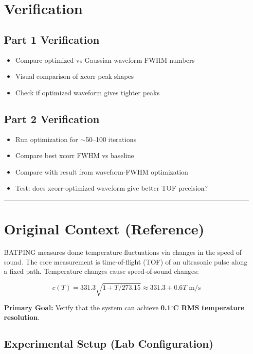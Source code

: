 \documentclass[11pt]{article}
\begin{document}
\section{Verification}

\subsection{Part 1 Verification}
\begin{itemize}
    \item Compare optimized vs Gaussian waveform FWHM numbers
    \item Visual comparison of xcorr peak shapes
    \item Check if optimized waveform gives tighter peaks
\end{itemize}

\subsection{Part 2 Verification}
\begin{itemize}
    \item Run optimization for $\sim$50--100 iterations
    \item Compare best xcorr FWHM vs baseline
    \item Compare with result from waveform-FWHM optimization
    \item Test: does xcorr-optimized waveform give better TOF precision?
\end{itemize}

\hrule
\vspace{1em}

\section{Original Context (Reference)}

BATPING measures dome temperature fluctuations via changes in the speed of sound. The core measurement is time-of-flight (TOF) of an ultrasonic pulse along a fixed path. Temperature changes cause speed-of-sound changes:

$$c(T) = 331.3 \sqrt{1 + T/273.15} \approx 331.3 + 0.6T \text{ m/s}$$

\textbf{Primary Goal:} Verify that the system can achieve \textbf{0.1$^\circ$C RMS temperature resolution}.

\subsection{Experimental Setup (Lab Configuration)}
\end{document}
